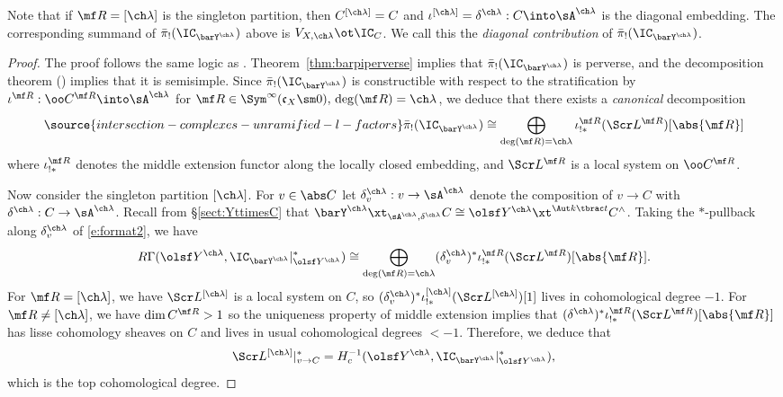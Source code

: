 Note that if $\mf R = [\ch\lambda]$ is the singleton partition, then
$C^{[\ch\lambda]}=C$ and
$\iota^{[\ch\lambda]}=\delta^{\ch\lambda} : C \into \sA^{\ch\lambda}$
is the diagonal embedding.
The corresponding summand of $\bar\pi_!(\IC_{\barY^{\ch\lambda}})$
above is $V_{X,\ch\lambda} \ot \IC_C$.
We call this the \emph{diagonal contribution} of
$\bar\pi_!(\IC_{\barY^{\ch\lambda}})$.

\begin{proof}
The proof follows the same logic as \cite[\S 5.4, 5.11]{BFGM}.
Theorem~\ref{thm:barpiperverse} implies that
$\bar\pi_!(\IC_{\barY^{\ch\lambda}})$ is perverse, and
the decomposition theorem (\cite[Th\'eor\`eme 6.2.5]{BBDG})
implies that it is semisimple.
Since $\bar\pi_!(\IC_{\barY^{\ch\lambda}})$ is constructible
with respect to the stratification by $\iota^{\mf R} : \oo C^{\mf R} \into \sA^{\ch\lambda}$ for $\mf R \in \Sym^\infty(\mathfrak c_X\sm 0),\,
\deg(\mf R)=\ch\lambda$, we deduce that there exists a \emph{canonical}
decomposition
\begin{equation}\label{e:format2}
\source{intersection-complexes-unramified-l-factors}
\bar\pi_!(\IC_{\barY^{\ch\lambda}}) \cong
\bigoplus_{\deg(\mf R)=\ch\lambda} \iota^{\mf R}_{!*}(\Scr L^{\mf R}) [\abs{\mf R}]
\end{equation}
where $\iota^{\mf R}_{!*}$ denotes the middle extension functor
along the locally closed embedding, and $\Scr L^{\mf R}$
is a local system on $\oo C^{\mf R}$.

Now consider the singleton partition $[\ch\lambda]$.
For $v \in \abs C$ let $\delta^{\ch\lambda}_v : v \to\sA^{\ch\lambda}$
denote the composition of $v\to C$ with $\delta^{\ch\lambda}:C\to \sA^{\ch\lambda}$.
Recall from \S\ref{sect:YttimesC}
that $\barY^{\ch\lambda} \xt_{\sA^{\ch\lambda}, \delta^{\ch\lambda}} C
\cong \olsf Y^{\ch\lambda} \xt^{\Aut k\tbrac t} C^\wedge$.
Taking the $*$-pullback along $\delta_v^{\ch\lambda}$ of \eqref{e:format2}, we
have
\[ R\Gamma( \olsf Y^{\ch\lambda}, \IC_{\barY^{\ch\lambda}}|^*_{\olsf Y^{\ch\lambda}})
\cong \bigoplus_{\deg(\mf R)=\ch\lambda} (\delta^{\ch\lambda}_v)^* \iota^{\mf R}_{!*}(\Scr L^{\mf R})[\abs{\mf R}]. \]
For $\mf R = [\ch\lambda]$, we have $\Scr L^{[\ch\lambda]}$ is a local system
on $C$, so $(\delta_v^{\ch\lambda})^* \iota^{[\ch\lambda]}_{!*}(\Scr L^{[\ch\lambda]})[1]$
lives in cohomological degree $-1$.
For $\mf R \ne [\ch\lambda]$, we have $\dim C^{\mf R} > 1$
so the uniqueness property of middle extension implies that
$(\delta^{\ch\lambda})^* \iota^{\mf R}_{!*}(\Scr L^{\mf R})[\abs{\mf R}]$
has lisse cohomology sheaves on $C$ and lives in usual cohomological degrees $< -1$.
Therefore, we deduce that
\[
    \Scr L^{[\ch\lambda]} |^*_{v\to C} = H_c^{-1}(\olsf Y^{\ch\lambda}, \IC_{\barY^{\ch\lambda}}|^*_{\olsf Y^{\ch\lambda}}),
\]
which is the top cohomological degree.


\end{proof}
